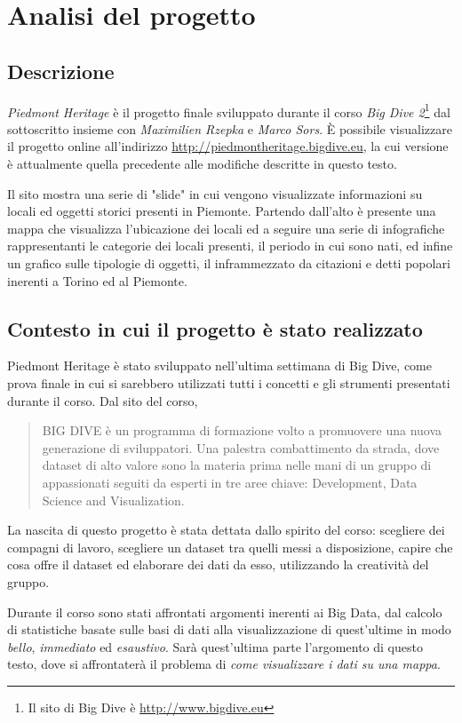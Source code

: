 \chapter{Analisi del progetto}
	\section{Descrizione}
	\emph{Piedmont Heritage} è il progetto finale sviluppato durante il corso \emph{Big Dive 2}\footnote{Il sito di Big Dive è \url{http://www.bigdive.eu}} dal sottoscritto insieme con \emph{Maximilien Rzepka} e \emph{Marco Sors}. \`{E} possibile visualizzare il progetto online all'indirizzo \url{http://piedmontheritage.bigdive.eu}, la cui versione è attualmente quella precedente alle modifiche descritte in questo testo.
	
	Il sito mostra una serie di "slide" in cui vengono visualizzate informazioni su locali ed oggetti storici presenti in Piemonte. Partendo dall'alto è presente una mappa che visualizza l'ubicazione dei locali ed a seguire una serie di infografiche rappresentanti le categorie dei locali presenti, il periodo in cui sono nati, ed infine un grafico sulle tipologie di oggetti, il inframmezzato da citazioni e detti popolari inerenti a Torino ed al Piemonte.
	
	\section{Contesto in cui il progetto è stato realizzato}
	Piedmont Heritage è stato sviluppato nell'ultima settimana di Big Dive, come prova finale in cui si sarebbero utilizzati tutti i concetti e gli strumenti presentati durante il corso. Dal sito del corso, \begin{quote}
	BIG DIVE è un programma di formazione volto a promuovere una nuova generazione di sviluppatori.
	Una palestra combattimento da strada, dove dataset di alto valore sono la materia prima nelle mani di un gruppo di appassionati seguiti da esperti in tre aree chiave: 
	Development, Data Science and Visualization.
	\end{quote}
	La nascita di questo progetto è stata dettata dallo spirito del corso: scegliere dei compagni di lavoro, scegliere un dataset tra quelli messi a disposizione, capire che cosa offre il dataset ed elaborare dei dati da esso, utilizzando la creatività del gruppo.
	
	Durante il corso sono stati affrontati argomenti inerenti ai Big Data, dal calcolo di statistiche basate sulle basi di dati alla visualizzazione di quest'ultime in modo \emph{bello}, \emph{immediato} ed \emph{esaustivo}. Sarà quest'ultima parte l'argomento di questo testo, dove si affrontaterà il problema di \emph{come visualizzare i dati su una mappa}.
	
